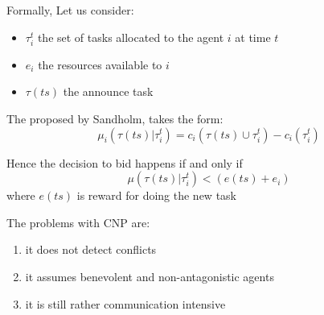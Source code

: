 Formally, Let us consider:
\begin{itemize}
\item $\tau_i^t$ the set of tasks allocated to the agent $i$ at time $t$
\item $e_i$ the resources available to $i$
\item $\tau(ts)$ the announce task
\end{itemize}

The  proposed by Sandholm, takes the form:
\[\mu_i(\tau(ts)|\tau_i^t) = c_i(\tau(ts) \cup \tau_i^t) - c_i(\tau_i^t)\]

Hence the decision to bid happens if and only if 
\[\mu(\tau(ts)|\tau_i^t) < (e(ts) + e_i)\]
where $e(ts)$ is reward for doing the new task

The problems with CNP are:
\begin{enumerate}
\item it does not detect conflicts
\item it assumes benevolent and non-antagonistic agents
\item it is still rather communication intensive
\end{enumerate}